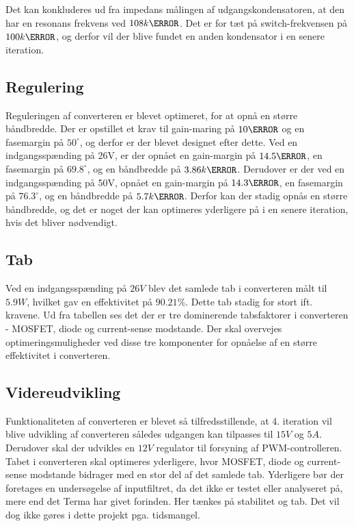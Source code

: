 Det kan konkluderes ud fra impedans målingen af udgangskondensatoren, at den har en resonans frekvens ved $108k\hertz$. Det er for tæt på switch-frekvensen på $100k\hertz$, og derfor vil der blive fundet en anden kondensator i en senere iteration.



\subsection{Regulering}
Reguleringen af converteren er blevet optimeret, for at opnå en større båndbredde. Der er opstillet et krav til gain-maring på $10\decibel$ og en fasemargin på $50^\circ$, og derfor er der blevet designet efter dette. Ved en indgangsspænding på 26V, er der opnået en gain-margin på $14.5\decibel$, en fasemargin på $69.8^\circ$, og en båndbredde på $3.86k\hertz$. Derudover er der ved en indgangsspænding på 50V, opnået en gain-margin på $14.3\decibel$, en fasemargin på $76.3^\circ$, og en båndbredde på $5.7k\hertz$. Derfor kan der stadig opnås en større båndbredde, og det er noget der kan optimeres yderligere på i en senere iteration, hvis det bliver nødvendigt.


\subsection{Tab}
Ved en indgangsspænding på $26V$ blev det samlede tab i converteren målt til $5.9W$, hvilket gav en effektivitet på $90.21\percent$. Dette tab stadig for stort ift. kravene. Ud fra tabellen ses det der er tre dominerende tabsfaktorer i converteren - MOSFET, diode og current-sense modstande. Der skal overvejes optimeringsmuligheder ved disse tre komponenter for opnåelse af en større effektivitet i converteren. 


\subsection{Videreudvikling}
Funktionaliteten af converteren er blevet så tilfredsstillende, at 4. iteration vil blive udvikling af converteren således udgangen kan tilpasses til $15V$ og $5A$. Derudover skal der udvikles en $12V$ regulator til forsyning af PWM-controlleren. Tabet i converteren skal optimeres yderligere, hvor MOSFET, diode og current-sense modstande bidrager med en stor del af det samlede tab. Yderligere bør der foretages en undersøgelse af inputfiltret, da det ikke er testet eller analyseret på, mere end det Terma har givet forinden. Her tænkes på stabilitet og tab. Det vil dog ikke gøres i dette projekt pga. tidsmangel. 





